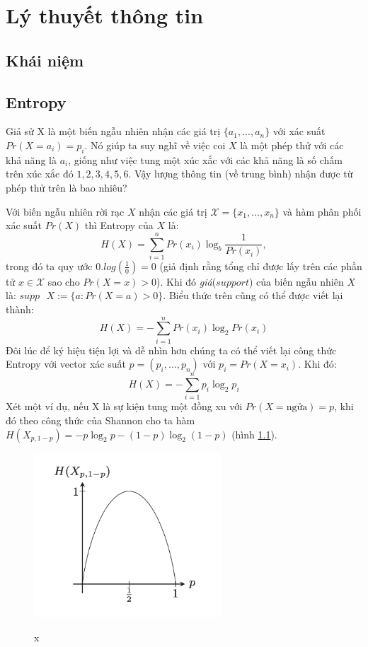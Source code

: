 \documentclass[a4paper, 12pt]{report}
\begin{document}
\chapter{Lý thuyết thông tin}
\section{Khái niệm}
\section{Entropy}
Giả sử X là một biến ngẫu nhiên nhận các giá trị $\{a_{1},...,a_{n}\}$ với xác suất $Pr(X=a_{i}) = p_{i}$. Nó giúp ta suy nghĩ về việc coi $X$ là một phép thử với các khả năng là $a_{i}$, giống như việc tung một xúc xắc với các khả năng là số chấm trên xúc xắc đó ${1,2,3,4,5,6}$. Vậy lượng thông tin (về trung bình) nhận được từ phép thử trên là bao nhiêu? 

Với biến ngẫu nhiên rời rạc  $X$ nhận các giá trị $\mathscr{X}=\{x_{1},...,x_{n}\}$ và hàm phân phối xác suất $Pr(X)$ thì Entropy của $X$ là:
\begin{equation*}
H(X) = \displaystyle \sum_{i=1}^{n}Pr(x_i)\log_{b}\frac{1}{Pr(x_i)},
\end{equation*}
trong đó ta quy ước $0.log(\frac{1}{0}) = 0$ (giả định rằng tổng chỉ được lấy trên các phần tử $x \in \mathscr{X}$ sao cho $Pr(X=x)>0$). Khi đó \textit{giá}($support$) của biến ngẫu nhiên $X$ là: $supp\textrm{ }X := \{a: Pr(X=a) > 0\}$. Biểu thức trên cũng có thể được viết lại thành: 
\begin{equation*}
H(X) = -\displaystyle \sum_{i=1}^{n}Pr(x_i)\log_{2}Pr(x_i)
\end{equation*}
Đôi lúc để ký hiệu tiện lợi và dễ nhìn hơn chúng ta có thể viết lại công thức Entropy với vector xác suất $p=(p_i,...,p_n)$ với $p_i = Pr(X=x_i)$. Khi đó:
\begin{equation*}
H(X) = -\displaystyle \sum_{i=1}^{n}p_i\log_{2}p_i
\end{equation*}
Xét một ví dụ, nếu X là sự kiện tung một đồng xu với $Pr(X = \textrm{ngửa}) = p$, khi đó theo công thức của Shannon cho ta hàm $H(X_{p,1-p}) = -p\log_{2}p-(1-p)\log_{2}(1-p)$ (hình \ref{fig:t}).
\begin{figure}
\begin{center}
	\includegraphics[width=7cm]{funcEntropy}\\
	\caption{x}
	\label{fig:t}
\end{center}
\end{figure}
\end{document}
